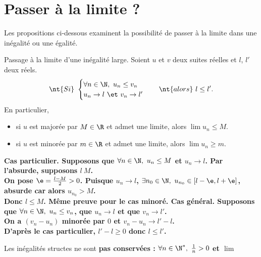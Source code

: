 \documentclass[11pt]{article}
\begin{document}
\section{Passer à la limite ?}

Les propositions ci-dessous examinent la possibilité de passer à la limite dans une inégalité ou une égalité.

\begin{prop}{Passage à la limite d'une inégalité large.}{}
    Soient $u$ et $v$ deux suites réelles et $l$, $l'$ deux réels.
    \begin{equation*}
        \nt{Si} ~ \begin{cases}\forall n \in \N, ~ u_n \leq v_n \\ u_n \to l ~\et~ v_n \to l'\end{cases} \quad \nt{alors} ~ l \leq l'.
    \end{equation*}
    En particulier,
    \begin{itemize}
        \item si $u$ est majorée par $M\in\R$ et admet une limite, alors $\lim u_n \leq M$.
        \item si $u$ est minorée par $m\in\R$ et admet une limite, alors $\lim u_n \geq m$.
    \end{itemize}
    \tcblower
    \bf{Cas particulier.} Supposons que $\forall n\in\N, ~ u_n \leq M$ et $u_n \to l$. Par l'absurde, supposons $l\> M$.\\
    On pose $\e=\frac{l-M}{2}>0$. Puisque $u_n\to l$, $\exists n_0 \in \N, ~ u_{n_0} \in [l-\e, l + \e]$, absurde car alors $u_{n_0} > M$.\\
    Donc $l\leq M$. Même preuve pour le cas minoré.\n
    \bf{Cas général.} Supposons que $\forall n \in \N, ~ u_n \leq v_n$, que $u_n \to l$ et que $v_n \to l'$.\\
    On a $(v_n - u_n)$ minorée par $0$ et $v_n-u_n \to l' - l$.\\
    D'après le cas particulier, $l'-l \geq 0$ donc $l\leq l'$.
\end{prop}

\warning Les inégalités structes ne sont \bf{pas} conservées : $\forall n \in \N^*, ~ \frac{1}{n}>0$ et $\lim$
\end{document}

